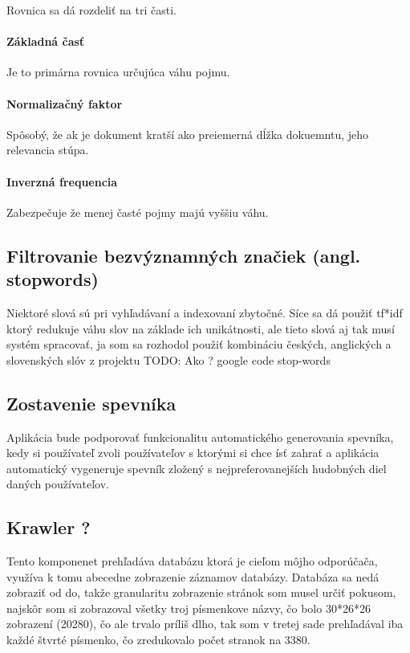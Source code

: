 Rovnica sa dá rozdeliť na tri časti.

\paragraph{Základná časť}
Je to primárna rovnica určujúca váhu pojmu.

\paragraph{Normalizačný faktor} 
Spôsobý, že ak je dokument kratší ako preiemerná dĺžka dokuemntu,
jeho relevancia stúpa. \cite{pivoted_doc_len}

\paragraph{Inverzná frequencia}
Zabezpečuje že menej časté pojmy majú vyššiu váhu.

\subsection{Filtrovanie bezvýznamných značiek (angl. stopwords)}

Niektoré slová sú pri vyhľadávaní a indexovaní zbytočné. Síce 
sa dá použiť tf*idf ktorý redukuje váhu slov na základe ich 
unikátnosti, ale tieto slová aj tak musí systém spracovať, ja som 
sa rozhodol použiť kombináciu českých, anglických a slovenských slóv z
projektu TODO: Ako ? google code stop-words


\subsection{Zostavenie spevníka}

Aplikácia bude podporovať funkcionalitu automatického generovania spevníka,
kedy si používateľ zvoli používateľov s ktorými si chce ísť zahrať
a aplikácia automatický vygeneruje spevník
zložený s nejpreferovanejších hudobných diel daných používateľov.

\subsection{Krawler ?}

Tento komponenet prehľadáva databázu ktorá je cieľom môjho odporúčača,
využíva k tomu abecedne zobrazenie záznamov databázy.
Databáza sa nedá zobraziť od do,
takže granularitu zobrazenie stránok som musel určiť pokusom,
najskôr som si zobrazoval všetky troj písmenkove názvy,
čo bolo 30*26*26 zobrazení (20280), čo ale trvalo príliš dlho,
tak som v tretej sade prehľadával iba každé štvrté písmenko,
čo zredukovalo počet stranok na 3380.

